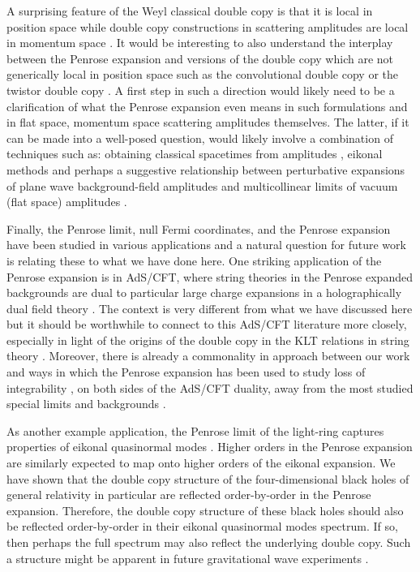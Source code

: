 A surprising feature of the Weyl classical double copy is that it is local in position space while double copy constructions in scattering amplitudes are local in momentum space \cite{Monteiro:2021ztt,Luna:2022dxo}. It would be interesting to also understand  the interplay between the Penrose expansion and versions of the double copy which are not generically local in position space such as the convolutional double copy \cite{Anastasiou:2014qba,Anastasiou:2018rdx,LopesCardoso:2018xes,Luna:2020adi} or the twistor double copy \cite{White:2020sfn,Chacon:2021wbr}. A first step in such a direction would likely need to be a clarification of what the Penrose expansion even means in such formulations and in flat space, momentum space scattering amplitudes themselves. The latter, if it can be made into a well-posed question, would likely involve a combination of techniques such as: obtaining classical spacetimes from amplitudes \cite{Boulware:1968zz,Duff:1973zz,Neill:2013wsa,Mougiakakos:2020laz}, eikonal methods \cite{DiVecchia:2023frv} and perhaps a suggestive relationship between perturbative expansions of plane wave background-field amplitudes and multicollinear limits of vacuum (flat space) amplitudes \cite{Adamo:2021hno}.

Finally, the Penrose limit, null Fermi coordinates, and the Penrose expansion have been studied in various applications and a natural question for future work is relating these to what we have done here. One striking application of the Penrose expansion is in AdS/CFT, where string theories in the Penrose expanded backgrounds are dual to particular large charge expansions in a holographically dual field theory \cite{Berenstein:2002jq,Callan:2003xr,Callan:2004uv,McLoughlin:2004dh,Minahan:2005mx,Minahan:2005qj}. The context is very different from what we have discussed here but it should be worthwhile to connect to this AdS/CFT literature more closely, especially in light of the origins of the double copy in the KLT relations in string theory \cite{Kawai:1985xq}. Moreover, there is already a commonality in approach between our work and ways in which the Penrose expansion has been used to study loss of integrability \cite{Beisert:2010jr}, on both sides of the AdS/CFT duality, away from the most studied special limits and backgrounds \cite{Asano:2015qwa,Alencar:2021ljc,McLoughlin:2022jyt}. 

As another example application, the Penrose limit of the light-ring captures properties of eikonal quasinormal modes \cite{Fransen:2023eqj,Kapec:2024lnr}. Higher orders in the Penrose expansion are similarly expected to map onto higher orders of the eikonal expansion. We have shown that the double copy structure of the four-dimensional black holes of general relativity in particular are reflected order-by-order in the Penrose expansion. Therefore, the double copy structure of these black holes should also be reflected order-by-order in their eikonal quasinormal modes spectrum. If so, then perhaps the full spectrum may also reflect the underlying double copy.  Such a structure might be apparent in future gravitational wave experiments  \cite{Bhagwat:2021kwv,Bhagwat:2023jwv,Pitte:2024zbi}.

